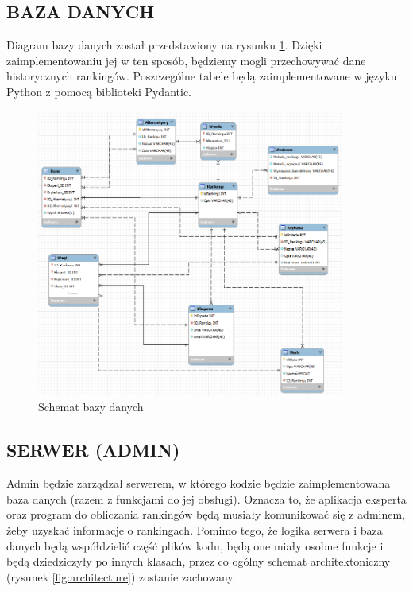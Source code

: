 \documentclass{article}
\begin{document}
\subsection{BAZA DANYCH}

Diagram bazy danych został przedstawiony na rysunku \ref{fig:database}. Dzięki
zaimplementowaniu jej w ten sposób, będziemy mogli przechowywać dane
historycznych rankingów. Poszczególne tabele będą zaimplementowane w
języku Python z pomocą biblioteki Pydantic.

\begin{figure}[H]
  \centering
  \includegraphics[width=0.9\textwidth]{Pictures/10000201000003640000032FB1B8D35E8021B7E0.png}

  \caption{\label{fig:database}Schemat bazy danych}
\end{figure}


\subsection{SERWER (ADMIN)}

Admin będzie zarządzał serwerem, w którego kodzie będzie
zaimplementowana baza danych (razem z funkcjami do jej obsługi). Oznacza
to, że aplikacja eksperta oraz program do obliczania rankingów będą
musiały komunikować się z adminem, żeby uzyskać informacje o 
rankingach. Pomimo tego, że logika serwera i baza danych będą
współdzielić część plików kodu, będą one miały osobne funkcje i będą
dziedziczyły po innych klasach, przez co ogólny schemat architektoniczny
(rysunek \ref{fig:architecture}) zostanie zachowany.
\end{document}
